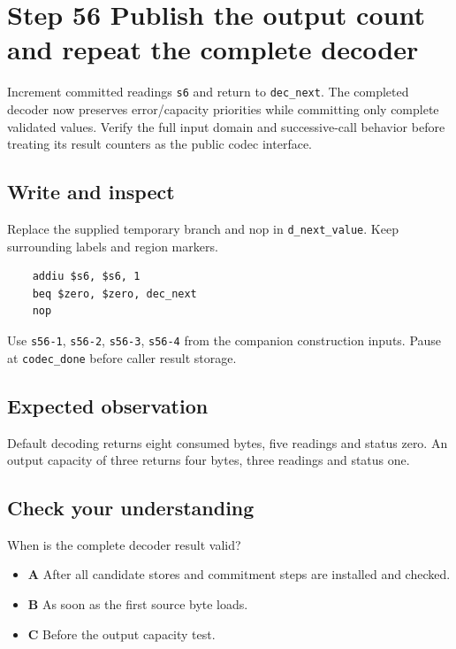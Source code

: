 \section{Step 56 Publish the output count and repeat the complete decoder}\label{delta-s56}

Increment committed readings \texttt{s6} and return to \texttt{dec\_next}. The completed decoder now preserves error/capacity priorities while committing only complete validated values. Verify the full input domain and successive-call behavior before treating its result counters as the public codec interface.

\subsection{Write and inspect}
Replace the supplied temporary branch and nop in \texttt{d\_next\_value}. Keep surrounding labels and region markers.

\begin{verbatim}
    addiu $s6, $s6, 1
    beq $zero, $zero, dec_next
    nop
\end{verbatim}
Use \texttt{s56-1}, \texttt{s56-2}, \texttt{s56-3}, \texttt{s56-4} from the companion construction inputs. Pause at \texttt{codec\_done} before caller result storage.

\subsection{Expected observation}
Default decoding returns eight consumed bytes, five readings and status zero. An output capacity of three returns four bytes, three readings and status one.

\subsection{Check your understanding}
When is the complete decoder result valid?

\begin{itemize}
\item \textbf{A} After all candidate stores and commitment steps are installed and checked.
\item \textbf{B} As soon as the first source byte loads.
\item \textbf{C} Before the output capacity test.
\end{itemize}
